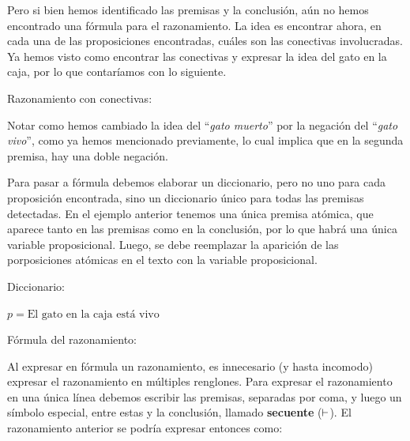 Pero si bien hemos identificado las premisas y la conclusión, aún no hemos
encontrado una fórmula para el razonamiento. La idea es encontrar ahora, en cada
una de las proposiciones encontradas, cuáles son las conectivas involucradas. Ya
hemos visto como encontrar las conectivas y expresar la idea del gato en la
caja, por lo que contaríamos con lo siguiente.

\begin{example}
    \sindent Razonamiento con conectivas:

    \begin{lreasoning}[width=0.6\textwidth,margin=\value{dindentwidth} pt]
          
    \end{lreasoning}
\end{example}

Notar como hemos cambiado la idea del ``\textit{gato muerto}'' por la negación
del ``\textit{gato vivo}'', como ya hemos mencionado previamente, lo cual
implica que en la segunda premisa, hay una doble negación.

Para pasar a fórmula debemos elaborar un diccionario, pero no uno para cada
proposición encontrada, sino un diccionario único para todas las premisas
detectadas. En el ejemplo anterior tenemos una única premisa atómica, que
aparece tanto en las premisas como en la conclusión, por lo que habrá una única
variable proposicional. Luego, se debe reemplazar la aparición de las
porposiciones atómicas en el texto con la variable proposicional.

\begin{example}
    \sindent Diccionario:

    \dindent $p = \text{El gato en la caja está vivo}$

    \sindent Fórmula del razonamiento:

    \begin{lreasoning}[width=0.6\textwidth,margin=\value{dindentwidth} pt]
    \end{lreasoning}
\end{example}

Al expresar en fórmula un razonamiento, es innecesario (y hasta incomodo)
expresar el razonamiento en múltiples renglones. Para expresar el razonamiento
en una única línea debemos escribir las premisas, separadas por coma, y luego un
símbolo especial, entre estas y la conclusión, llamado \textbf{secuente}
($\vdash$). El razonamiento anterior se podría expresar entonces como:

